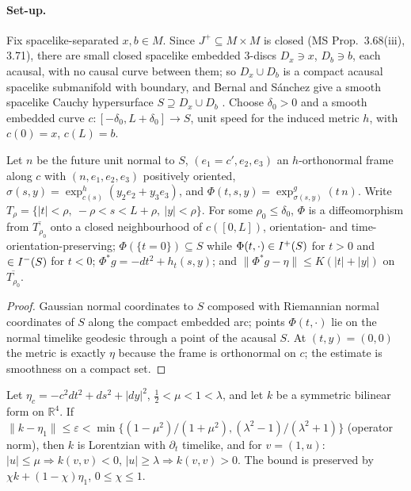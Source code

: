 \paragraph{Set-up.} Fix spacelike-separated $x,b\in M$. Since $J^+\subseteq
M\times M$ is closed (MS Prop.~3.68(iii), 3.71), there are small closed
spacelike embedded $3$-discs $D_x\ni x$, $D_b\ni b$, each acausal, with no causal
curve between them; so $D_x\cup D_b$ is a compact acausal spacelike
submanifold with boundary, and Bernal and Sánchez give a smooth spacelike
Cauchy hypersurface $S\supseteq D_x\cup D_b$ \citep[Thm.~1.1, Rem.~4.14]{BS2006}.
Choose $\delta_0>0$ and a smooth embedded curve $c:[-\delta_0,L+\delta_0]\to S$,
unit speed for the induced metric $h$, with $c(0)=x$, $c(L)=b$.

\begin{lemma}\label{lem:B}
Let $n$ be the future unit normal to $S$, $(e_1=c',e_2,e_3)$ an $h$-orthonormal
frame along $c$ with $(n,e_1,e_2,e_3)$ positively oriented,
$\sigma(s,y)=\exp^h_{c(s)}(y_2e_2+y_3e_3)$, and
$\Phi(t,s,y)=\exp^g_{\sigma(s,y)}(t\,n)$. Write
$T_\rho=\{|t|<\rho,\ -\rho<s<L+\rho,\ |y|<\rho\}$. For some $\rho_0\le\delta_0$,
$\Phi$ is a diffeomorphism from $\overline{T_{\rho_0}}$ onto a closed
neighbourhood of $c([0,L])$, orientation- and time-orientation-preserving;
$\Phi(\{t=0\})\subseteq S$ while $\Phi(t,\cdot)\in I^{+}(S)$ for $t>0$ and
$\in I^{-}(S)$ for $t<0$; $\Phi^*g=-dt^2+h_t(s,y)$; and
$\|\Phi^*g-\eta\|\le K(|t|+|y|)$ on $\overline{T_{\rho_0}}$.
\end{lemma}

\begin{proof}
Gaussian normal coordinates to $S$ composed with Riemannian normal
coordinates of $S$ along the compact embedded arc; points $\Phi(t,\cdot)$ lie
on the normal timelike geodesic through a point of the acausal $S$. At
$(t,y)=(0,0)$ the metric is exactly $\eta$ because the frame is orthonormal on
$c$; the estimate is smoothness on a compact set.
\end{proof}

\begin{lemma}\label{lem:C}
Let $\eta_c=-c^2dt^2+ds^2+|dy|^2$, $\tfrac12<\mu<1<\lambda$, and let $k$ be a
symmetric bilinear form on $\mathbb R^4$. If
$\|k-\eta_1\|\le\varepsilon<\min\{(1-\mu^2)/(1+\mu^2),(\lambda^2-1)/(\lambda^2+1)\}$
(operator norm), then $k$ is Lorentzian with $\partial_t$ timelike, and for
$v=(1,u)$: $|u|\le\mu\Rightarrow k(v,v)<0$, $|u|\ge\lambda\Rightarrow
k(v,v)>0$. The bound is preserved by $\chi k+(1-\chi)\eta_1$, $0\le\chi\le1$.
\end{lemma}

